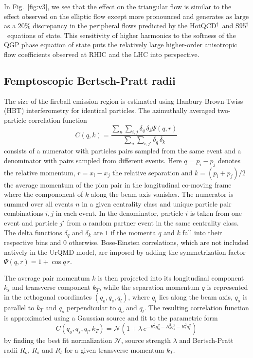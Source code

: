 \documentclass[aps,prc,reprint,amsmath,nofootinbib,superscriptaddress]{revtex4-1}
\newcommand{\hotqcd}{HotQCD$^\dagger$~}
\newcommand{\spv}{S95$^\dagger$~}
\begin{document}
In Fig.~\ref{fig:v3}, we see that the effect on the triangular flow is similar to the effect observed on the elliptic flow except more pronounced and generates as large as a $20\%$ discrepancy in the peripheral flows
predicted by the \hotqcd and \spv equations of state. This sensitivity of higher harmonics to the softness of the QGP phase equation of state puts the relatively large higher-order anisotropic flow coefficients observed at
RHIC and the LHC into perspective. 

\subsection{Femptoscopic Bertsch-Pratt radii}
\label{hbt}

The size of the fireball emission region is estimated using Hanbury-Brown-Twiss (HBT) interferometry for identical particles. The azimuthally averaged two-particle correlation function 
\begin{equation}
 \label{hbt}
 C(q, k) = \frac{\sum\limits_n \sum\limits_{i, j} \delta_{q} \, \delta_{k}\Psi(q,r)}{\sum\limits_{n} \sum\limits_{i,j'} \delta_{q} \, \delta_{k}}
\end{equation}
consists of a numerator with particles pairs sampled from the same event and a denominator with pairs sampled from different events. Here $q = p_i - p_j$ denotes the relative momentum, $r=x_i-x_j$ the relative separation and $k = (p_i + p_j)/2$ the average momentum of the pion pair in the longitudinal co-moving 
frame where the compononent of $k$ along the beam axis vanishes. The numerator is summed over all events $n$ in a given centrality class and unique particle pair combinations $i,j$ in each event. In the denominator, particle $i$ is
taken from one event and particle $j'$ from a random partner event in the same centrality class. The delta functions $\delta_q$ and $\delta_k$ are $1$ if the momenta $q$ and $k$ fall into their respective bins and $0$ otherwise. Bose-Einsten 
correlations, which are not included natively in the UrQMD model, are imposed by adding the symmetrization factor $\Psi(q,r) = 1 + \cos q\,r$. 

The average pair momentum $k$ is then projected into its longitudinal component $k_\text{z}$ and transverse component $k_T$, while the separation momentum $q$ is represented in the orthogonal coordinates 
$(q_o, q_s, q_l)$, where $q_l$ lies along the beam axis, $q_o$ is parallel to $k_T$ and $q_s$ perpendicular to $q_o$ and $q_l$. The resulting correlation function is approximated using a Gaussian source and 
fit to the parametric form
\begin{equation}
 \label{fitfunction}
 C(q_o, q_s, q_l, k_T) = \mathcal{N} \left(1 + \lambda\, e^{-R_o^2 q_o^2 - R_s^2 q_s^2 - R_l^2 q_l^2} \right) 
\end{equation}
by finding the best fit normalization $\mathcal{N}$, source strength $\lambda$ and Bertsch-Pratt radii $R_o$, $R_s$ and $R_l$ for a given transverse momentum $k_T$. 
\end{document}
